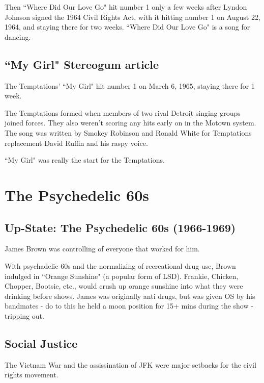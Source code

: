 \documentclass[12pt, a4paper, twoside, openright, titlepage]{book}
\begin{document}
Then ``Where Did Our Love Go" hit number 1 only a few weeks after Lyndon Johnson signed the 1964 Civil Rights Act, with it hitting number 1 on August 22, 1964, and staying there for two weeks. ``Where Did Our Love Go" is a song for dancing. 


\section{``My Girl" Stereogum article}

The Temptations' ``My Girl" hit number 1 on March 6, 1965, staying there for 1 week.


The Temptations formed when members of two rival Detroit singing groups joined forces. They also weren't scoring any hits early on in the Motown system. The song was written by Smokey Robinson and Ronald White for Temptations replacement David Ruffin and his raspy voice. 

``My Girl" was really the start for the Temptations.




\chapter{The Psychedelic 60s}


\section{Up-State: The Psychedelic 60s (1966-1969)}

\begin{rec}{}{}
    James Brown was controlling of everyone that worked for him.
\end{rec}

With psychadelic 60s and the normalizing of recreational drug use, Brown indulged in ``Orange Sunshine" (a popular form of LSD). Frankie, Chicken, Chopper, Bootsie, etc., would crush up orange sunshine into what they were drinking before shows. James was originally anti drugs, but was given OS by his bandmates - do to this he held a moon position for 15+ mins during the show - tripping out.


\section{Social Justice}

\begin{rmk}{}{}
    The Vietnam War and the assissination of JFK were major setbacks for the civil rights movement.
\end{rmk}
\end{document}

